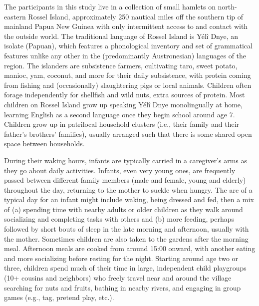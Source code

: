 \documentclass[,man,floatsintext]{apa6}
\begin{document}
The participants in this study live in a collection of small hamlets on
north-eastern Rossel Island, approximately 250 nautical miles off the
southern tip of mainland Papua New Guinea with only intermittent access
to and contact with the outside world. The traditional language of
Rossel Island is Yélî Dnye, an isolate (Papuan), which features a
phonological inventory and set of grammatical features unlike any other
in the (predominantly Austronesian) languages of the region. The
islanders are subsistence farmers, cultivating taro, sweet potato,
manioc, yam, coconut, and more for their daily subsistence, with protein
coming from fishing and (occasionally) slaughtering pigs or local
animals. Children often forage independently for shellfish and wild
nuts, extra sources of protein. Most children on Rossel Island grow up
speaking Yélî Dnye monolingually at home, learning English as a second
language once they begin school around age 7. Children grow up in
patrilocal household clusters (i.e., their family and their father's
brothers' families), usually arranged such that there is some shared
open space between households.

During their waking hours, infants are typically carried in a
caregiver's arms as they go about daily activities. Infants, even very
young ones, are frequently passed between different family members (male
and female, young and elderly) throughout the day, returning to the
mother to suckle when hungry. The arc of a typical day for an infant
might include waking, being dressed and fed, then a mix of (a) spending
time with nearby adults or older children as they walk around
socializing and completing tasks with others and (b) more feeding,
perhaps followed by short bouts of sleep in the late morning and
afternoon, usually with the mother. Sometimes children are also taken to
the gardens after the morning meal. Afternoon meals are cooked from
around 15:00 onward, with another eating and more socializing before
resting for the night. Starting around age two or three, children spend
much of their time in large, independent child playgroups (10+ cousins
and neighbors) who freely travel near and around the village searching
for nuts and fruits, bathing in nearby rivers, and engaging in group
games (e.g., tag, pretend play, etc.).
\end{document}
